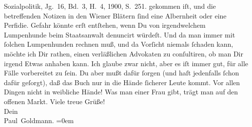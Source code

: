 \begin{ledgroupsized}[t]{13cm}
{{{{                        Sozialpolitik}, Jg. 16, Bd. 3, H. 4, 1900,
                     S. 251.}}}\label{K_L02913-1h} gekommen iſt, und die betreffenden Notizen in den Wiener Blätern ſind eine Albernheit oder eine
               Perfidie. Gefahr könnte erſt entſtehen, wenn Du von irgendwelchem Lumpenhunde beim
                   Staatsanwalt denuncirt würdeſt. Und da man
               immer mit ſolchen Lumpenhunden rechnen muß, und da Vorſicht niemals ſchaden kann, {\pb}möchte ich Dir rathen, einen verläßlichen Advokaten
               zu conſultiren, ob man Dir irgend Etwas anhaben kann. Ich glaube zwar nicht, aber es
               iſt immer gut, für alle Fälle  vorbereitet zu ſein.
               Du aber mußt dafür ſorgen (und haſt jedenfalls ſchon dafür geſorgt), daß das Buch nur in die Hände ſicherer
               Leute kommt. Vor allen  Dingen nicht in weibliche
               Hände! Was man einer Frau gibt, trägt man auf den offenen Markt. \label{K_L02913-3v}\label{K_L02913-3h}\pend
           \pstart
           Viele treue Grüße! {\\[\baselineskip]}Dein {\\[\baselineskip]}\spacefill\mbox{Paul Goldmann.}\pend
           \leftskip=0em{}
         
         \endnumbering{}\end{ledgroupsized}\begin{anhang}\end{anhang}\newcommand{\dateiname}{L02913}\newcommand{\titel}{Paul Goldmann an Arthur Schnitzler, 27. 4. [1900]}\newcommand{\editorInnen}{Martin Anton Müller und Laura Untner}
      